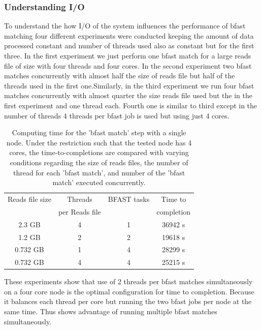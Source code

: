 \documentclass{acm_proc_article-sp}
\begin{document}
\subsubsection{Understanding I/O}
{
To understand the how I/O of the system influences the performance of bfast matching four different experiments were conducted keeping the amount of data processed constant and number of threads used also as constant but for the first three. In the first experiment we just perform one bfast match for a large reads file of size with four threads and four cores. In the second experiment two bfast matches concurrently with almost half the size of reads file but half of the threads used in the first one.Similarly, in the third experiment we run four bfast matches concurrently with almost quarter the size reads file used but the in the first experiment and one thread each. Fourth one is similar to third except in the number of threads 4 threads per bfast job is used but using just 4 cores.

 \begin{table}
 \begin{tabular}{|c|c|c|c|} 
 \hline 
Reads file size & Threads  & BFAST tasks & Time to \\
& per Reads file&  &  completion \\  \hline
2.3 GB &  4 & 1 & 36942 s \\
1.2 GB & 2 & 2 & 19618 s \\
0.732 GB & 1 & 4 & 28299 s\\ 
0.732  GB & 4 & 4 & 25215 s\\

 \hline
 \end{tabular}
 \label{table:understand I/o} 
 \caption{Computing time for the 'bfast match' step with a single node.  Under the restriction such that the tested node has 4 cores, the time-to-completions are compared with varying conditions regarding the size of reads files, the number of thread for each 'bfast match', and number of the 'bfast match' executed concurrently.}
\end{table}

These experiments show that use of 2 threads per bfast matches simultaneously on a four core node is the optimal configuration for time to completion. Because it balances each thread per core but  running the two bfast jobs per node at the same time. Thus shows advantage of running multiple bfast matches simultaneously. 


}

\end{document}
